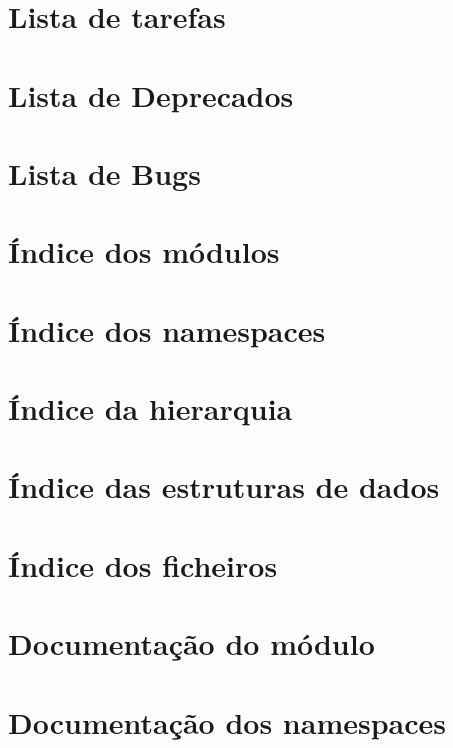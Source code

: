 \documentclass[twoside]{book}
\begin{document}
\chapter{Lista de tarefas}
\label{todo}
\hypertarget{todo}{}

\chapter{Lista de Deprecados}
\label{deprecated}
\hypertarget{deprecated}{}

\chapter{Lista de Bugs}
\label{bug}
\hypertarget{bug}{}

\chapter{Índice dos módulos}

\chapter{Índice dos namespaces}

\chapter{Índice da hierarquia}

\chapter{Índice das estruturas de dados}

\chapter{Índice dos ficheiros}

\chapter{Documentação do módulo}









\chapter{Documentação dos namespaces}







\end{document}
